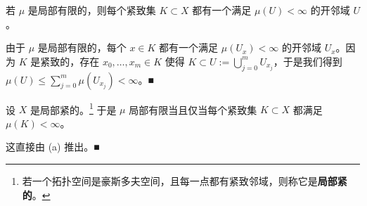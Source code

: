 \begin{remark}

\begin{items}
\item

若 $ \mu $ 是局部有限的，则每个紧致集 $ K \subset X $ 都有一个满足 $ \mu(U) < \infty $ 的开邻域 $ U $。

\proofhead
由于 $ \mu $ 是局部有限的，每个 $ x \in K $ 都有一个满足 $ \mu(U_x) < \infty $ 的开邻域 $ U_x $。因为 $ K $ 是紧致的，存在 $ x_0, \ldots, x_m \in K $ 使得 $ K \subset U := \bigcup_{j=0}^{m} U_{x_j} $，于是我们得到 $ \mu(U) \le \sum_{j=0}^{m} \mu(U_{x_j}) < \infty $。\nobreak\hspace{0.35em}■
\item

设 $ X $ 是局部紧的。\footnote{若一个拓扑空间是豪斯多夫空间，且每一点都有紧致邻域，则称它是\textbf{局部紧的}。} 于是 $ \mu $ 局部有限当且仅当每个紧致集 $ K \subset X $ 都满足 $ \mu(K) < \infty $。

\proofhead
这直接由 (a) 推出。\nobreak\hspace{0.35em}■
\end{items}

\end{remark}

